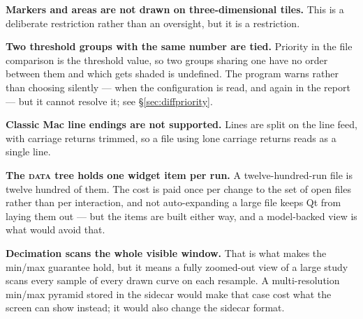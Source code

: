\documentclass[11pt,a4paper,oneside]{report}
\newcommand{\tab}[1]{\textsc{#1}}
\begin{document}
\textbf{Markers and areas are not drawn on three-dimensional tiles.} This is a
deliberate restriction rather than an oversight, but it is a restriction.

\textbf{Two threshold groups with the same number are tied.} Priority in the
file comparison is the threshold value, so two groups sharing one have no order
between them and which gets shaded is undefined. The program warns rather than
choosing silently --- when the configuration is read, and again in the report
--- but it cannot resolve it; see \S\ref{sec:diffpriority}.

\textbf{Classic Mac line endings are not supported.} Lines are split on the line
feed, with carriage returns trimmed, so a file using lone carriage returns reads
as a single line.

\textbf{The \tab{data} tree holds one widget item per run.} A twelve-hundred-run
file is twelve hundred of them. The cost is paid once per change to the set of
open files rather than per interaction, and not auto-expanding a large file
keeps Qt from laying them out --- but the items are built either way, and a
model-backed view is what would avoid that.

\textbf{Decimation scans the whole visible window.} That is what makes the
min/max guarantee hold, but it means a fully zoomed-out view of a large study
scans every sample of every drawn curve on each resample. A multi-resolution
min/max pyramid stored in the sidecar would make that case cost what the screen
can show instead; it would also change the sidecar format.
\end{document}
